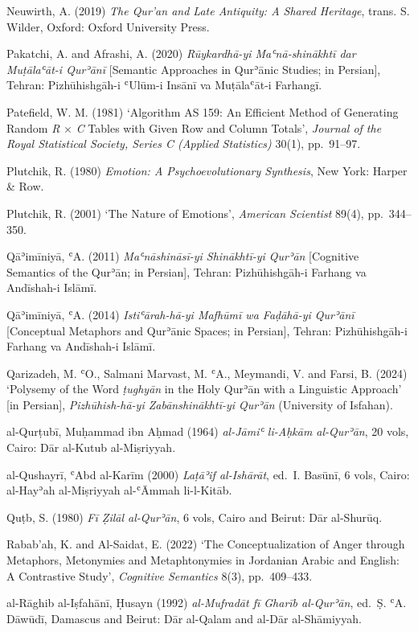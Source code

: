 Neuwirth, A. (2019) \emph{The Qur'an and Late Antiquity: A Shared
Heritage}, trans. S. Wilder, Oxford: Oxford University Press.

Pakatchi, A. and Afrashi, A. (2020) \emph{Rūykardhā-yi Maʿnā-shinākhtī
dar Muṭālaʿāt-i Qurʾānī} {[}Semantic Approaches in Qurʾānic Studies; in
Persian{]}, Tehran: Pizhūhishgāh-i ʿUlūm-i Insānī va Muṭālaʿāt-i
Farhangī.

Patefield, W. M. (1981) `Algorithm AS 159: An Efficient Method of
Generating Random \emph{R} × \emph{C} Tables with Given Row and Column
Totals', \emph{Journal of the Royal Statistical Society, Series C
(Applied Statistics)} 30(1), pp.~91--97.

Plutchik, R. (1980) \emph{Emotion: A Psychoevolutionary Synthesis}, New
York: Harper \& Row.

Plutchik, R. (2001) `The Nature of Emotions', \emph{American Scientist}
89(4), pp.~344--350.

Qāʾimīniyā, ʿA. (2011) \emph{Maʿnāshināsī-yi Shinākhtī-yi Qurʾān}
{[}Cognitive Semantics of the Qurʾān; in Persian{]}, Tehran:
Pizhūhishgāh-i Farhang va Andīshah-i Islāmī.

Qāʾimīniyā, ʿA. (2014) \emph{Istiʿārah-hā-yi Mafhūmī wa Faḍāhā-yi
Qurʾānī} {[}Conceptual Metaphors and Qurʾānic Spaces; in Persian{]},
Tehran: Pizhūhishgāh-i Farhang va Andīshah-i Islāmī.

Qarizadeh, M. ʿO., Salmani Marvast, M. ʿA., Meymandi, V. and Farsi, B.
(2024) `Polysemy of the Word \emph{ṭughyān} in the Holy Qurʾān with a
Linguistic Approach' {[}in Persian{]}, \emph{Pizhūhish-hā-yi
Zabānshinākhtī-yi Qurʾān} (University of Isfahan).

al-Qurṭubī, Muḥammad ibn Aḥmad (1964) \emph{al-Jāmiʿ li-Aḥkām
al-Qurʾān}, 20 vols, Cairo: Dār al-Kutub al-Miṣriyyah.

al-Qushayrī, ʿAbd al-Karīm (2000) \emph{Laṭāʾif al-Ishārāt}, ed.~I.
Basūnī, 6 vols, Cairo: al-Hayʾah al-Miṣriyyah al-ʿĀmmah li-l-Kitāb.

Quṭb, S. (1980) \emph{Fī Ẓilāl al-Qurʾān}, 6 vols, Cairo and Beirut: Dār
al-Shurūq.

Rabab'ah, K. and Al-Saidat, E. (2022) `The Conceptualization of Anger
through Metaphors, Metonymies and Metaphtonymies in Jordanian Arabic and
English: A Contrastive Study', \emph{Cognitive Semantics} 8(3),
pp.~409--433.

al-Rāghib al-Iṣfahānī, Ḥusayn (1992) \emph{al-Mufradāt fī Gharīb
al-Qurʾān}, ed.~Ṣ. ʿA. Dāwūdī, Damascus and Beirut: Dār al-Qalam and
al-Dār al-Shāmiyyah.

